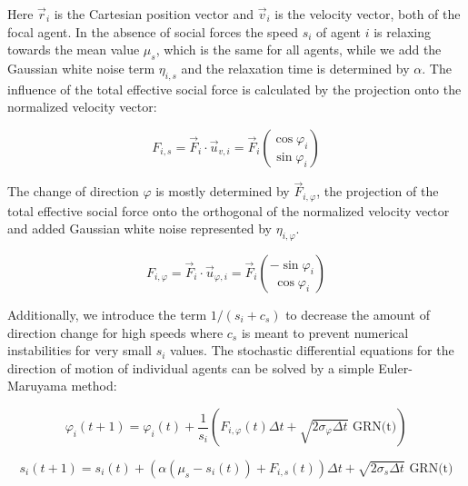	Here $\vec{r}_i$ is the Cartesian position vector and $\vec{v}_i$ is the velocity vector, both of the focal agent.
	In the absence of social forces the speed $s_i$ of agent $i$ is relaxing towards the mean value $\mu_{s}$, which is the same for all agents, while we add the Gaussian white noise term $\eta_{i, s}$ and the relaxation time is determined by $\alpha$.
	The influence of the total effective social force is calculated by the projection onto the normalized velocity vector:
	
	\begin{equation}
		F_{i, s}=\vec{F}_i \cdot \vec{u}_{v, i} = \vec{F}_i { \cos\varphi_i \choose \sin\varphi_i }
		\label{eq:s_force}
	\end{equation}
	
	The change of direction $\varphi$ is mostly determined by $\vec{F}_{i,\varphi}$, the projection of the total effective social force onto the orthogonal of the normalized velocity vector and added Gaussian white noise represented by $\eta_{i,\varphi}$.
	
	\begin{equation}
		F_{i,\varphi}=\vec{F}_i \cdot \vec{u}_{\varphi,i} = \vec{F}_i {-\sin\varphi_i \choose \cos\varphi_i }
		\label{eq:phi_force}
	\end{equation}
	
	Additionally, we introduce the term $1/(s_i + c_s)$ to decrease the amount of direction change for high speeds where $c_s$ is meant to prevent numerical instabilities for very small $s_i$ values.
	The stochastic differential equations for the direction of motion of individual agents can be solved by a simple Euler-Maruyama method:
	
	\begin{equation}
		\varphi_i(t+1) = \varphi_i(t) + \frac{1}{s_i}\left( F_{i,\varphi}(t)\Delta t + \sqrt{2 \sigma_{\varphi}\Delta t} \text{ GRN(t)}\right)
		\label{eq:phi_update}
	\end{equation}
	
	\begin{equation}
		s_i(t+1) = s_i(t) + (\alpha (\mu_s - s_i(t)) + F_{i, s}(t))\Delta t + \sqrt{2 \sigma_{s} \Delta t} \text{ GRN(t)}
		\label{eq:s_update}
	\end{equation}
	
